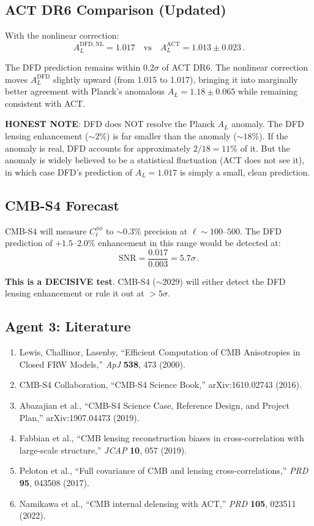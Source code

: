 \documentclass[11pt,a4paper]{article}
\begin{document}
\subsection{ACT DR6 Comparison (Updated)}

With the nonlinear correction:
\begin{equation}
A_L^{\mathrm{DFD,NL}} = 1.017 \quad\text{vs}\quad A_L^{\mathrm{ACT}} = 1.013 \pm 0.023\,.
\end{equation}

The DFD prediction remains within $0.2\sigma$ of ACT DR6. The nonlinear correction moves $A_L^{\mathrm{DFD}}$ slightly upward (from 1.015 to 1.017), bringing it into marginally better agreement with Planck's anomalous $A_L = 1.18 \pm 0.065$ while remaining consistent with ACT.

\textbf{HONEST NOTE}: DFD does NOT resolve the Planck $A_L$ anomaly. The DFD lensing enhancement ($\sim 2\%$) is far smaller than the anomaly ($\sim 18\%$). If the anomaly is real, DFD accounts for approximately $2/18 = 11\%$ of it. But the anomaly is widely believed to be a statistical fluctuation (ACT does not see it), in which case DFD's prediction of $A_L = 1.017$ is simply a small, clean prediction.

\subsection{CMB-S4 Forecast}

CMB-S4 will measure $C_\ell^{\phi\phi}$ to $\sim 0.3\%$ precision at $\ell \sim 100$--$500$. The DFD prediction of $+1.5$--$2.0\%$ enhancement in this range would be detected at:
\begin{equation}
\mathrm{SNR} = \frac{0.017}{0.003} = 5.7\sigma\,.
\end{equation}

\textbf{This is a DECISIVE test}. CMB-S4 ($\sim$2029) will either detect the DFD lensing enhancement or rule it out at $> 5\sigma$.

\subsection{Agent 3: Literature}

\begin{enumerate}
\item Lewis, Challinor, Lasenby, ``Efficient Computation of CMB Anisotropies in Closed FRW Models,'' \textit{ApJ} \textbf{538}, 473 (2000).
\item CMB-S4 Collaboration, ``CMB-S4 Science Book,'' arXiv:1610.02743 (2016).
\item Abazajian et al., ``CMB-S4 Science Case, Reference Design, and Project Plan,'' arXiv:1907.04473 (2019).
\item Fabbian et al., ``CMB lensing reconstruction biases in cross-correlation with large-scale structure,'' \textit{JCAP} \textbf{10}, 057 (2019).
\item Peloton et al., ``Full covariance of CMB and lensing cross-correlations,'' \textit{PRD} \textbf{95}, 043508 (2017).
\item Namikawa et al., ``CMB internal delensing with ACT,'' \textit{PRD} \textbf{105}, 023511 (2022).
\end{enumerate}
\end{document}
